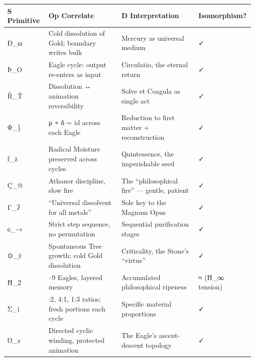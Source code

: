 {\def\LTcaptype{none} %
\begin{longtable}[]{@{}
  >{\raggedright\arraybackslash}p{}
  >{\raggedright\arraybackslash}p{}
  >{\raggedright\arraybackslash}p{}
  >{\raggedright\arraybackslash}p{}@{}}
\toprule\noalign{}
\begin{minipage}[b]{\linewidth}\raggedright
S Primitive
\end{minipage} & \begin{minipage}[b]{\linewidth}\raggedright
Op Correlate
\end{minipage} & \begin{minipage}[b]{\linewidth}\raggedright
D Interpretation
\end{minipage} & \begin{minipage}[b]{\linewidth}\raggedright
Isomorphism?
\end{minipage} \\
\midrule\noalign{}
\endhead
\bottomrule\noalign{}
\endlastfoot
Ð\_ω & Cold dissolution of Gold; boundary writes bulk & Mercury as
universal medium & ✓ \\
Þ\_O & Eagle cycle: output re-enters as input & Circulatio, the eternal
return & ✓ \\
Ř\_Ť & Dissolution ↔ animation reversibility & Solve et Coagula as
single act & ✓ \\
Φ\_\} & μ ∘ δ = id across each Eagle & Reduction to first matter +
reconstruction & ✓ \\
ƒ\_ż & Radical Moisture preserved across cycles & Quintessence, the
imperishable seed & ✓ \\
Ç\_@ & Athanor discipline, slow fire & The ``philosophical fire'' ---
gentle, patient & ✓ \\
Γ\_ʔ & ``Universal dissolvent for all metals'' & Sole key to the Magnum
Opus & ✓ \\
ɢ\_→ & Strict step sequence, no permutation & Sequential purification
stages & ✓ \\
⊙\_ÿ & Spontaneous Tree growth; cold Gold dissolution & Criticality, the
Stone's ``virtue'' & ✓ \\
Ħ\_2 & 7--9 Eagles, layered memory & Accumulated philosophical ripeness
& ≈ (Ħ\_∞ tension) \\
Σ\_ï & 1:2, 4:1, 1:3 ratios; fresh portions each cycle & Specific
material proportions & ✓ \\
Ω\_z & Directed cyclic winding, protected animation & The Eagle's
ascent-descent topology & ✓ \\
\end{longtable}
}

